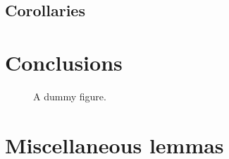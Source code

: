 \documentclass[draft,reqno]{etna}
\begin{document}
\begin{remark}
  \lipsum[4]
\end{remark}
\begin{example}
  \lipsum[5]
\end{example}
\subsection{Corollaries}
\begin{corollary}
  \lipsum[6]
\end{corollary}
\begin{lemma}
  \lipsum[27]
\end{lemma}

\section{Conclusions}
\lipsum[10-12]

\begin{figure}
  \caption{A dummy figure.}
\end{figure}

\appendix

\section{Miscellaneous lemmas}
\lipsum[13-15]


%
\end{document}
